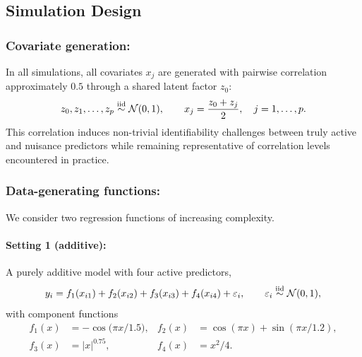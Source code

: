 \subsection{Simulation Design}
\label{subsec:ch3-simdesign}

\subsubsection*{Covariate generation:}

In all simulations, all covariates $x_j$ are generated with pairwise
correlation approximately $0.5$ through a shared latent factor $z_0$:
\begin{equation}
  z_0, z_1, \ldots, z_p \overset{\mathrm{iid}}{\sim} \mathcal{N}(0, 1),
  \qquad
  x_j = \frac{z_0 + z_j}{2}, \quad j = 1, \ldots, p.
  \label{eq:ch3-covgen}
\end{equation}
This correlation induces non-trivial identifiability challenges
between truly active and nuisance predictors while remaining
representative of correlation levels encountered in practice.

\subsubsection*{Data-generating functions:}

We consider two regression functions of increasing complexity.

\paragraph{Setting 1 (additive):}
A purely additive model with four active predictors,
\begin{equation}
  y_i = f_1(x_{i1}) + f_2(x_{i2}) + f_3(x_{i3}) + f_4(x_{i4})
        + \varepsilon_i,
  \qquad \varepsilon_i \overset{\mathrm{iid}}{\sim} \mathcal{N}(0, 1),
  \label{eq:ch3-setting1}
\end{equation}
with component functions
\begin{equation}
  \begin{aligned}
    f_1(x) &= -\cos\!\bigl(\pi x / 1.5\bigr),
    & f_2(x) &= \cos(\pi x) + \sin(\pi x / 1.2), \\
    f_3(x) &= |x|^{0.75},
    & f_4(x) &= x^2 / 4.
  \end{aligned}
  \label{eq:ch3-setting1-f}
\end{equation}


